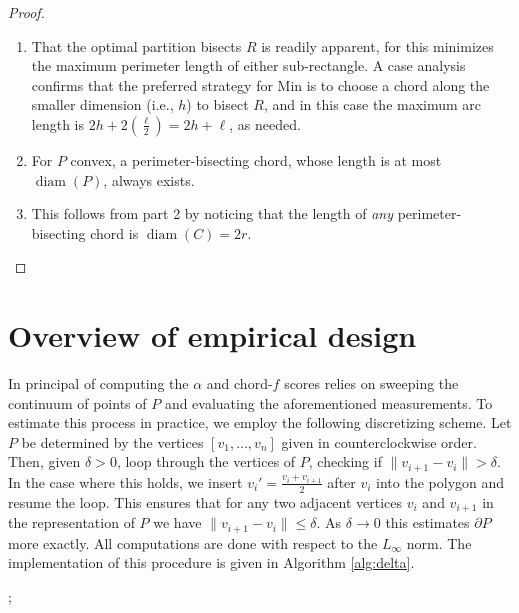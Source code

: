 \documentclass[]{jocg}
\newcommand{\norm}[1]{\|#1\|}
\DeclareMathOperator{\diam}{\mathrm{diam}}
\theoremstyle{definition}
\theoremstyle{remark}
\begin{document}
\begin{proof}
  \begin{enumerate}
    \item That the optimal partition bisects $R$ is readily apparent,
      for this minimizes the maximum perimeter length of either sub-rectangle.
      A case analysis confirms that the preferred strategy for Min is to choose
      a chord along the smaller dimension (i.e., $h$) to bisect $R$, and in this
      case the maximum arc length is $2h + 2\left( \frac{\ell}{2} \right) = 2h +
      \ell$, as needed.
    \item For $P$ convex, a perimeter-bisecting chord, whose length is at most
      $\diam(P)$, always exists. 
    \item This follows from part 2 by noticing that the length of \emph{any}
      perimeter-bisecting chord is $\diam(C) = 2r$. \qedhere
  \end{enumerate}
\end{proof}

\section{Overview of empirical design}

In principal of computing the $\alpha$ and chord-$f$ scores relies on sweeping
the continuum of points of $P$ and evaluating the aforementioned measurements.
To estimate this process in practice, we employ the following discretizing
scheme. Let $P$ be determined by the vertices $[v_1, \dots, v_n]$ given in
counterclockwise order. Then, given $\delta > 0$, loop through the vertices of
$P$, checking if $\norm{v_{i+1} - v_i} > \delta$. In the case where this holds,
we insert $v_i' = \frac{v_i + v_{i+1}}{2}$ after $v_i$ into the polygon and
resume the loop. This ensures that for any two adjacent vertices $v_{i}$ and
$v_{i+1}$ in the representation of $P$ we have $\norm{v_{i+1} - v_i} \leq
\delta$. As $\delta \to 0$ this estimates $\partial P$ more exactly. All
computations are done with respect to the $L_{\infty}$ norm. The implementation
of this procedure is given in Algorithm \ref{alg:delta}.


\begin{algorithm}[h]
  \begin{algorithmic}[0]
    ;
    \If {$\norm{\textit{next}(v) - v}_2 > \delta$}
      \EndIf
      \EndWhile
      \EndProcedure
    \end{algorithmic}
    \label{alg:delta}
\end{algorithm}
\end{document}
